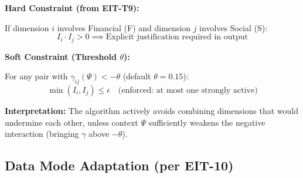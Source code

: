 \begin{tcolorbox}[colback=red!5!white, colframe=red!75!black,
    title=\textbf{Constraint EIT-EMP-2-C1: Crowding-Out Avoidance}]

\textbf{Hard Constraint (from EIT-T9):}

If dimension $i$ involves Financial (F) and dimension $j$ involves Social (S):
\begin{equation}
I_i \cdot I_j > 0 \implies \text{Explicit justification required in output}
\end{equation}

\textbf{Soft Constraint (Threshold $\theta$):}

For any pair with $\gamma_{ij}(\Psi) < -\theta$ (default $\theta = 0.15$):
\begin{equation}
\min(I_i, I_j) \leq \epsilon \quad \text{(enforced: at most one strongly active)}
\end{equation}

\textbf{Interpretation:} The algorithm actively avoids combining dimensions that would undermine each other, unless context $\Psi$ sufficiently weakens the negative interaction (bringing $\gamma$ above $-\theta$).

\end{tcolorbox}

\subsection{Data Mode Adaptation (per EIT-10)}
\label{subsec:data-mode-adaptation}

